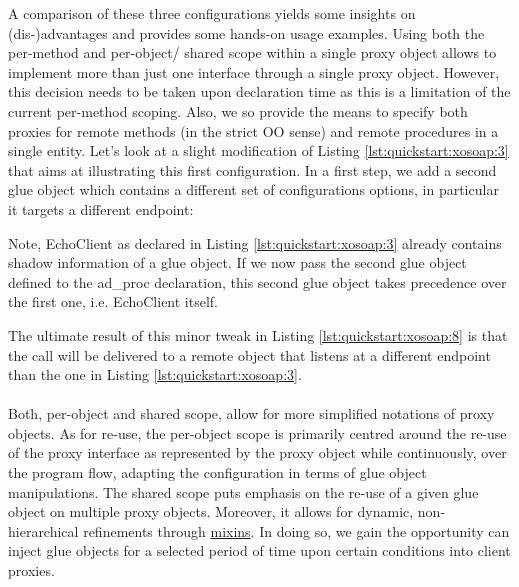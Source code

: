 A comparison of these three configurations yields some insights on (dis-)advantages and provides some  hands-on usage examples. Using both the per-method and per-object/ shared scope within a single proxy object allows to implement more than just one interface through a single proxy object. However, this decision needs to be taken upon declaration time as this is a limitation of the current per-method scoping. Also, we so provide the means to specify both proxies for remote methods (in the strict OO sense) and remote procedures in a single entity. Let's look at a slight modification of Listing \ref{lst:quickstart:xosoap:3} that aims at illustrating this first configuration. In a first step, we add a second glue object which contains a different set of configurations options, in particular it targets a different endpoint:
%
\lstset{breaklines=true,numbers=left,basicstyle=\footnotesize,frame=single}

%
Note, EchoClient as declared in Listing \ref{lst:quickstart:xosoap:3} already contains shadow information of a glue object. If we now pass the second glue object defined to the ad\_proc declaration, this second glue object takes precedence over the first one, i.e. EchoClient itself.
%

%
The ultimate result of this minor tweak in Listing \ref{lst:quickstart:xosoap:8} is that the call will be delivered to a remote object that listens at a different endpoint than the one in Listing \ref{lst:quickstart:xosoap:3}.\\\\
Both, per-object and shared scope, allow for more simplified notations of proxy objects.  As for re-use, the per-object scope is primarily centred around the re-use of the proxy interface as represented by the proxy object while continuously, over the program flow, adapting the configuration in terms of glue object manipulations. The shared scope puts emphasis on the re-use of a given glue object on multiple proxy objects. Moreover, it allows for dynamic, non-hierarchical refinements through \href{http://media.wu-wien.ac.at/doc/tutorial.html#mixins}{mixins}. In doing so, we gain the opportunity can inject glue objects for a selected period of time upon certain conditions into client proxies. 

